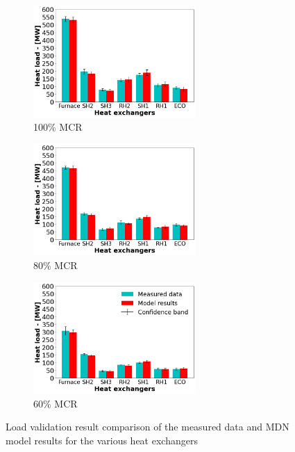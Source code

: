 \documentclass[a4paper,fleqn]{cas-sc}
\begin{document}
\begin{figure}
\centering
\begin{subfigure}{0.33\textwidth}
    \includegraphics[width=\textwidth, height = 4.25cm]{100_CASE}
    \caption{100\% MCR}
\end{subfigure}\hfill %
\begin{subfigure}{0.33\textwidth}
    \includegraphics[width=\linewidth, height = 4.25cm]{80_CASE}
    \caption{80\% MCR}
\end{subfigure}\hfill
\begin{subfigure}{0.33\textwidth}
	\includegraphics[width=\linewidth, height = 4.25cm]{60_CASE}
        \caption{60\% MCR}
\end{subfigure}
\caption{Load validation result comparison of the measured data and MDN model results for the various heat exchangers}
\label{fig_heat_load}
\end{figure}
\end{document}

